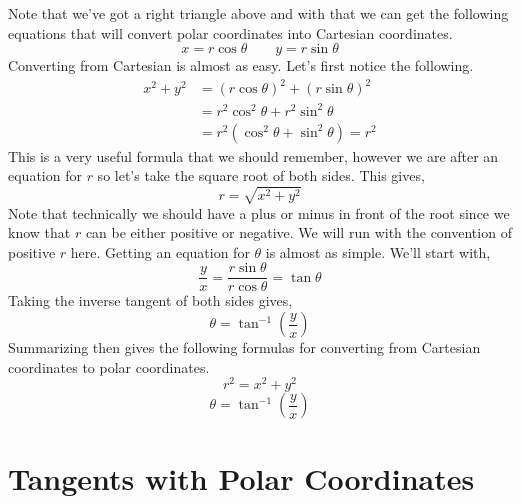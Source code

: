 \documentclass[10pt,reqno]{book}
\theoremstyle{definition}
\begin{document}
	Note that we've got a right triangle above and with that we can get the following equations that will convert  polar coordinates into Cartesian coordinates.
	\[ x = r\cos\theta \qquad y = r\sin\theta \]
	Converting from Cartesian is almost as easy.  Let's first notice the following.
	\begin{align*}
		x^2 + y^2 &= (r\cos\theta)^2 + (r\sin\theta)^2\\
		&= r^2\cos^2\theta + r^2\sin^2\theta\\
		&= r^2(\cos^2\theta + \sin^2\theta) = r^2
	\end{align*}
	This is a very useful formula that we should remember, however we are after an equation for $ r $ so let's take the square root of both sides. This gives,
	\[ r = \sqrt{x^2 + y^2} \]
	Note that technically we should have a plus or minus in front of the root since we know that $ r $ can be either positive or negative.  We will run with the convention of positive $ r $ here. Getting an equation for $ \theta $ is almost as simple. We'll start with,
	\[ \frac{y}{x} = \frac{r\sin\theta}{r\cos\theta} = \tan\theta \]
	Taking the inverse tangent of both sides gives,
	\[ \theta = \tan^{-1} \left( \frac{y}{x} \right) \]
	Summarizing then gives the following formulas for converting from Cartesian coordinates to polar coordinates.
	\[ r^2 = x^2 + y^2 \]
	\[ \theta = \tan^{-1} \left( \frac{y}{x} \right) \]
	
	
	\section{Tangents with Polar Coordinates}
	
\end{document}
